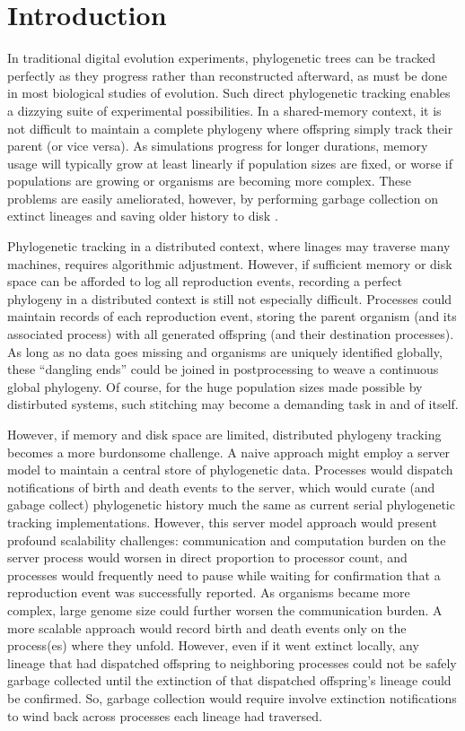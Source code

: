 \section{Introduction} \label{sec:introduction}

In traditional digital evolution experiments, phylogenetic trees can be tracked perfectly as they progress \citep{bohm2017mabe,wang2018vine,lalejini2019data} rather than reconstructed afterward, as must be done in most biological studies of evolution.
Such direct phylogenetic tracking enables a dizzying suite of experimental possibilities.
In a shared-memory context, it is not difficult to maintain a complete phylogeny where offspring simply track their parent (or vice versa).
As simulations progress for longer durations, memory usage will typically grow at least linearly if population sizes are fixed, or worse if populations are growing or organisms are becoming more complex.
These problems are easily ameliorated, however, by performing garbage collection on extinct lineages and saving older history to disk \citep{bohm2017mabe,dolson2019modes}.

Phylogenetic tracking in a distributed context, where linages may traverse many machines, requires algorithmic adjustment.
However, if sufficient memory or disk space can be afforded to log all reproduction events, recording a perfect phylogeny in a distributed context is still not especially difficult.
Processes could maintain records of each reproduction event, storing the parent organism (and its associated process) with all generated offspring (and their destination processes).
As long as no data goes missing and organisms are uniquely identified globally, these ``dangling ends'' could be joined in postprocessing to weave a continuous global phylogeny.
Of course, for the huge population sizes made possible by distirbuted systems, such stitching may become a demanding task in and of itself.

However, if memory and disk space are limited, distributed phylogeny tracking becomes a more burdonsome challenge.
A naive approach might employ a server model to maintain a central store of phylogenetic data.
Processes would dispatch notifications of birth and death events to the server, which would curate (and gabage collect) phylogenetic history much the same as current serial phylogenetic tracking implementations.
However, this server model approach would present profound scalability challenges: communication and computation burden on the server process would worsen in direct proportion to processor count, and processes would frequently need to pause while waiting for confirmation that a reproduction event was successfully reported.
As organisms became more complex, large genome size could further worsen the communication burden.
A more scalable approach would record birth and death events only on the process(es) where they unfold.
However, even if it went extinct locally, any lineage that had dispatched offspring to neighboring processes could not be safely garbage collected until the extinction of that dispatched offspring's lineage could be confirmed.
So, garbage collection would require involve extinction notifications to wind back across processes each lineage had traversed.

